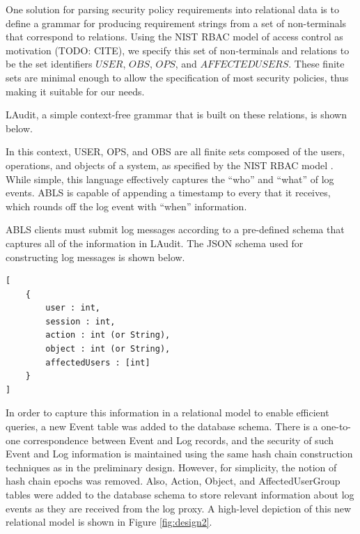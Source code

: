 \documentclass{sig-alternate}
\begin{document}
One solution for parsing security policy requirements into relational data is to define a grammar for producing 
requirement strings from a set of non-terminals that correspond to relations. Using the NIST RBAC model of
access control as motivation (TODO: CITE), we specify this set of non-terminals and relations to be the set identifiers 
$USER$, $OBS$, $OPS$, and $AFFECTEDUSERS$. These finite sets are minimal enough to allow the specification
of most security policies, thus making it suitable for our needs. 

LAudit, a simple context-free grammar that is built on these relations, is shown below.


\vspace{.35cm} 
In this context, USER, OPS, and OBS are all finite sets composed of the users, operations, and objects of a
system, as specified by the NIST RBAC model \cite{Sandhu2000-nist-rbac}. While simple, this language effectively
captures the ``who'' and ``what'' of log events. ABLS is capable of appending a timestamp to every that it receives,
which rounds off the log event with ``when'' information. 

ABLS clients must submit log messages according to a pre-defined schema that captures
all of the information in LAudit. The JSON schema used for constructing log messages is shown below.

\begin{lstlisting}
[
    {
        user : int,
        session : int,
        action : int (or String),
        object : int (or String),
        affectedUsers : [int]
    }
]
\end{lstlisting}

In order to capture this information in a relational model to enable efficient queries, a new Event table was added
to the database schema. There is a one-to-one correspondence between Event 
and Log records, and the security of such Event
and Log information is maintained using the same hash chain construction techniques as in the preliminary design.
However, for simplicity, the notion of hash chain epochs was removed.
Also, Action, Object, and AffectedUserGroup tables were added to the database schema to store relevant information
about log events as they are received from the log proxy. A high-level depiction of this new relational model is shown
in Figure \ref{fig:design2}.
\end{document}
